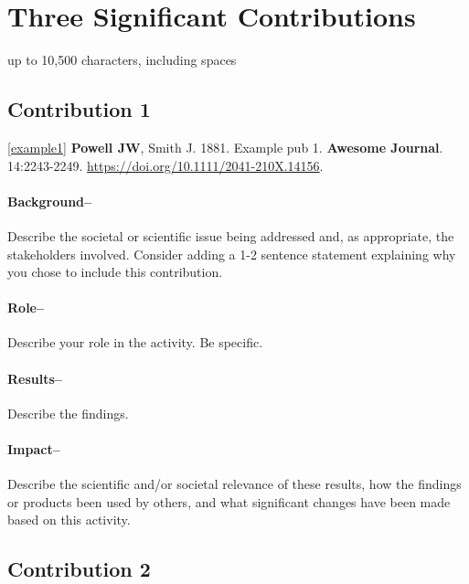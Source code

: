\section*{Three Significant Contributions}

\vspace{-0.2cm}
\begin{center}
  {\color{red} \footnotesize{up to 10,500 characters, including spaces}}\\
\end{center}

\subsection*{Contribution 1}

\noindent \ref{example1}
\textbf{Powell JW}, Smith J.
1881.
Example pub 1.
\textbf{Awesome Journal}. 14:2243-2249.
\url{https://doi.org/10.1111/2041-210X.14156}.


\paragraph{Background--} 

Describe the societal or scientific issue being addressed and, as appropriate, the stakeholders involved. Consider adding a 1-2 sentence statement explaining why you chose to include this contribution.

\paragraph{Role--}

Describe your role in the activity. Be specific.

\paragraph{Results--} 

Describe the findings.

\paragraph{Impact--} 

Describe the scientific and/or societal relevance of these results, how the findings or products been used by others, and what significant changes have been made based on this activity.

\newpage
  
\subsection*{Contribution 2}

